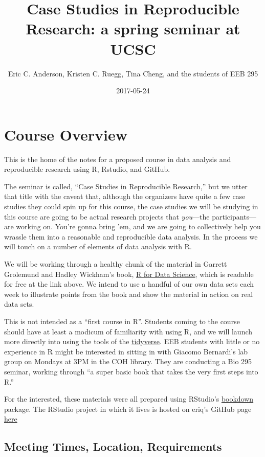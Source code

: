 \documentclass[]{book}
\title{Case Studies in Reproducible Research: a spring seminar at UCSC}
\author{Eric C. Anderson, Kristen C. Ruegg, Tina Cheng, and the students of EEB
295}
\date{2017-05-24}
\theoremstyle{definition}
\theoremstyle{definition}
\theoremstyle{remark}
\begin{document}
\maketitle

{
\setcounter{tocdepth}{1}
\tableofcontents
}
\chapter{Course Overview}\label{course-overview}

This is the home of the notes for a proposed course in data analysis and
reproducible research using R, Rstudio, and GitHub.

The seminar is called, ``Case Studies in Reproducible Research,'' but we
utter that title with the caveat that, although the organizers have
quite a few case studies they could spin up for this course, the case
studies we will be studying in this course are going to be actual
research projects that \emph{you}---the participants---are working on.
You're gonna bring 'em, and we are going to collectively help you
wrassle them into a reasonable and reproducible data analysis. In the
process we will touch on a number of elements of data analysis with R.

We will be working through a healthy chunk of the material in Garrett
Grolemund and Hadley Wickham's book, \href{http://r4ds.had.co.nz/}{R for
Data Science}, which is readable for free at the link above. We intend
to use a handful of our own data sets each week to illustrate points
from the book and show the material in action on real data sets.

This is not intended as a ``first course in R''. Students coming to the
course should have at least a modicum of familiarity with using R, and
we will launch more directly into using the tools of the
\href{http://tidyverse.org/}{tidyverse}. EEB students with little or no
experience in R might be interested in sitting in with Giacomo
Bernardi's lab group on Mondays at 3PM in the COH library. They are
conducting a Bio 295 seminar, working through ``a super basic book that
takes the very first steps into R.''

For the interested, these materials were all prepared using RStudio's
\href{https://bookdown.org/}{bookdown} package. The RStudio project in
which it lives is hosted on eriq's GitHub page
\href{https://github.com/eriqande/rep-res-eeb-2017}{here}

\section{Meeting Times, Location,
Requirements}\label{meeting-times-location-requirements}
\end{document}
